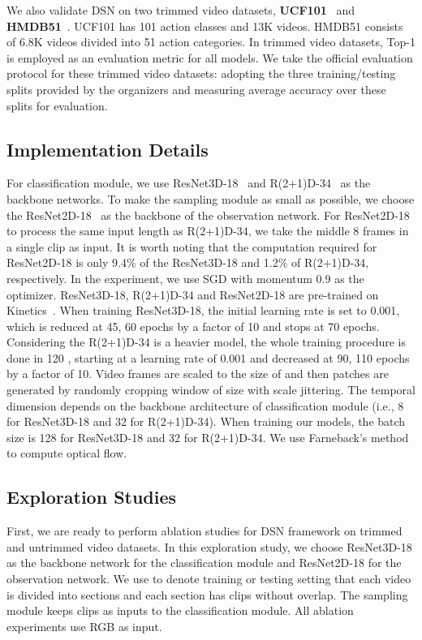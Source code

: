 \documentclass[journal]{IEEEtran}
\begin{document}
We also validate DSN on two trimmed video datasets, \textbf{UCF101}~\cite{abs-1212-0402} and \textbf{HMDB51}~\cite{KuehneJGPS11}.
UCF101 has 101 action classes and 13K videos.
HMDB51 consists of 6.8K videos divided into 51 action categories. In trimmed video datasets, Top-1 is employed as an evaluation metric for all models.
We take the official evaluation protocol for these trimmed video datasets: adopting the three training/testing splits provided by the organizers and measuring average accuracy over these splits for evaluation.





\subsection{Implementation Details}
For classification module, we use ResNet3D-18~\cite{abs-1708-05038} and R(2+1)D-34~\cite{R2+1D} as the backbone networks.
To make the sampling module as small as possible, we choose the ResNet2D-18~\cite{R2+1D} as the backbone of the observation network.
For ResNet2D-18 to process the same input length as R(2+1)D-34, we take the middle 8 frames in a single clip as input.
It is worth noting that the computation required for ResNet2D-18 is only 9.4\% of the ResNet3D-18 and 1.2\% of R(2+1)D-34, respectively.
In the experiment, we use SGD with momentum 0.9 as the optimizer.
ResNet3D-18, R(2+1)D-34 and ResNet2D-18 are pre-trained on Kinetics~\cite{CarreiraZ17}.
When training ResNet3D-18, the initial learning rate is set to 0.001, which is reduced at 45, 60 epochs by a factor of 10 and stops at 70 epochs.
Considering the R(2+1)D-34 is a heavier model, the whole training procedure is done in 120 , starting at a learning rate of 0.001 and decreased at 90, 110 epochs by a factor of 10.
Video frames are scaled to the size of  and then patches are generated by randomly cropping window of size  with scale jittering.
The temporal dimension  depends on the backbone architecture of classification module (i.e., 8 for ResNet3D-18 and 32 for R(2+1)D-34).
When training our models, the batch size is 128 for ResNet3D-18 and 32 for R(2+1)D-34.
We use Farneback’s method~\cite{optical-flow} to compute optical flow.


\subsection{Exploration Studies}
First, we are ready to perform ablation studies for DSN framework on trimmed and untrimmed video datasets.
In this exploration study, we choose ResNet3D-18 as the backbone network for the classification module and ResNet2D-18 for the observation network.
We use  to denote training or testing setting that each video is divided into  sections and each section has  clips without overlap.
The sampling module keeps  clips as inputs to the classification module.
All ablation experiments use RGB as input.
\end{document}
